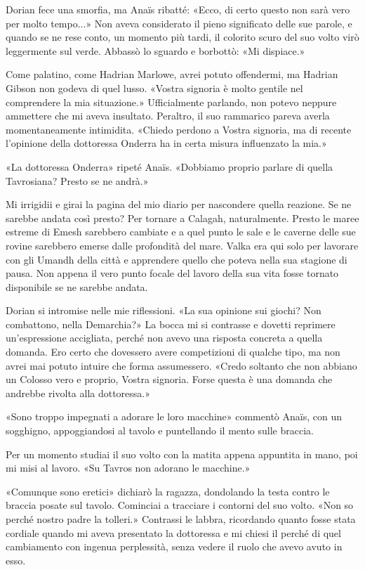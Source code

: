 Dorian fece una smorfia, ma Anaïs ribatté: «Ecco, di certo questo non
sarà vero per molto tempo...» Non aveva considerato il pieno significato
delle sue parole, e quando se ne rese conto, un momento più tardi, il
colorito scuro del suo volto virò leggermente sul verde. Abbassò lo
sguardo e borbottò: «Mi dispiace.»

Come palatino, come Hadrian Marlowe, avrei potuto offendermi, ma Hadrian
Gibson non godeva di quel lusso. «Vostra signoria è molto gentile nel
comprendere la mia situazione.» Ufficialmente parlando, non potevo
neppure ammettere che mi aveva insultato. Peraltro, il suo rammarico
pareva averla momentaneamente intimidita. «Chiedo perdono a Vostra
signoria, ma di recente l'opinione della dottoressa Onderra ha in certa
misura influenzato la mia.»

«La dottoressa Onderra» ripeté Anaïs. «Dobbiamo proprio parlare di
quella Tavrosiana? Presto se ne andrà.»

Mi irrigidii e girai la pagina del mio diario per nascondere quella
reazione. Se ne sarebbe andata così presto? Per tornare a Calagah,
naturalmente. Presto le maree estreme di Emesh sarebbero cambiate e a
quel punto le sale e le caverne delle sue rovine sarebbero emerse dalle
profondità del mare. Valka era qui solo per lavorare con gli Umandh
della città e apprendere quello che poteva nella sua stagione di pausa.
Non appena il vero punto focale del lavoro della sua vita fosse tornato
disponibile se ne sarebbe andata.

Dorian si intromise nelle mie riflessioni. «La sua opinione sui giochi?
Non combattono, nella Demarchia?» La bocca mi si contrasse e dovetti
reprimere un'espressione accigliata, perché non avevo una risposta
concreta a quella domanda. Ero certo che {dovessero} avere competizioni
di qualche tipo, ma non avrei mai potuto intuire che forma assumessero.
«Credo soltanto che non abbiano un Colosso vero e proprio, Vostra
signoria. Forse questa è una domanda che andrebbe rivolta alla
dottoressa.»

«Sono troppo impegnati a adorare le loro macchine» commentò Anaïs, con
un sogghigno, appoggiandosi al tavolo e puntellando il mento sulle
braccia.

Per un momento studiai il suo volto con la matita appena appuntita in
mano, poi mi misi al lavoro. «Su Tavros non adorano le macchine.»

«Comunque sono eretici» dichiarò la ragazza, dondolando la testa contro
le braccia posate sul tavolo. Cominciai a tracciare i contorni del suo
volto. «Non so perché nostro padre la tolleri.» Contrassi le labbra,
ricordando quanto fosse stata cordiale quando mi aveva presentato la
dottoressa e mi chiesi il perché di quel cambiamento con ingenua
perplessità, senza vedere il ruolo che avevo avuto in esso.

